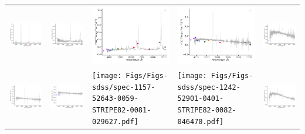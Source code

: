 \begin{center}
\begin{longtable}{l l l l l }
    \includegraphics[width=0.19\linewidth, clip]{Figs/Figs-sdss/spec-1114-53179-0599-STRIPE82-0110-008449.pdf} & \includegraphics[width=0.19\linewidth, clip]{Figs/Figs-sdss/spec-1115-52914-0588-STRIPE82-0108-009933.pdf} & \includegraphics[width=0.19\linewidth, clip]{Figs/Figs-sdss/spec-1116-52932-0478-STRIPE82-0104-027921.pdf} & \includegraphics[width=0.19\linewidth, clip]{Figs/Figs-sdss/spec-1143-52592-0242-SPLUS-s02s08-040033.pdf} & \includegraphics[width=0.19\linewidth, clip]{Figs/Figs-sdss/spec-1144-53238-0450-STRIPE82-0138-042700.pdf} \\
    \includegraphics[width=0.19\linewidth, clip]{Figs/Figs-sdss/spec-1152-52941-0144-STRIPE82-0123-036291.pdf} & \includegraphics[width=0.19\linewidth, clip]{Figs/Figs-sdss/spec-1152-52941-0599-STRIPE82-0123-045029.pdf} & \texttt{[image: Figs/Figs-sdss/spec-1157-52643-0059-STRIPE82-0081-029627.pdf]} & \texttt{[image: Figs/Figs-sdss/spec-1242-52901-0401-STRIPE82-0082-046470.pdf]} & \includegraphics[width=0.19\linewidth, clip]{Figs/Figs-sdss/spec-1474-52933-0180-STRIPE82-0129-037205.pdf} \\

\end{longtable}
\end{center}
